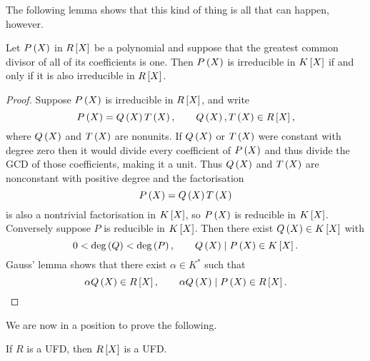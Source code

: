 The following lemma shows that this kind of thing is all that can happen, however.

\begin{proposition}
Let $ P\rb{X} $ in $ R\sb{X} $ be a polynomial and suppose that the greatest common divisor of all of its coefficients is one. Then $ P\rb{X} $ is irreducible in $ K\sb{X} $ if and only if it is also irreducible in $ R\sb{X} $.
\end{proposition}

\begin{proof}
Suppose $ P\rb{X} $ is irreducible in $ R\sb{X} $, and write
$$ P\rb{X} = Q\rb{X}T\rb{X}, \qquad Q\rb{X}, T\rb{X} \in R\sb{X}, $$
where $ Q\rb{X} $ and $ T\rb{X} $ are nonunits. If $ Q\rb{X} $ or $ T\rb{X} $ were constant with degree zero then it would divide every coefficient of $ P\rb{X} $ and thus divide the GCD of those coefficients, making it a unit. Thus $ Q\rb{X} $ and $ T\rb{X} $ are nonconstant with positive degree and the factorisation
$$ P\rb{X} = Q\rb{X}T\rb{X} $$
is also a nontrivial factorisation in $ K\sb{X} $, so $ P\rb{X} $ is reducible in $ K\sb{X} $. Conversely suppose $ P $ is reducible in $ K\sb{X} $. Then there exist $ Q\rb{X} \in K\sb{X} $ with
$$ 0 < \deg\rb{Q} < \deg\rb{P}, \qquad Q\rb{X} \mid P\rb{X} \in K\sb{X}. $$
Gauss' lemma shows that there exist $ \alpha \in K^* $ such that
$$ \alpha Q\rb{X} \in R\sb{X}, \qquad \alpha Q\rb{X} \mid P\rb{X} \in R\sb{X}. $$
\end{proof}

We are now in a position to prove the following.

\begin{theorem}
If $ R $ is a UFD, then $ R\sb{X} $ is a UFD.
\end{theorem}

